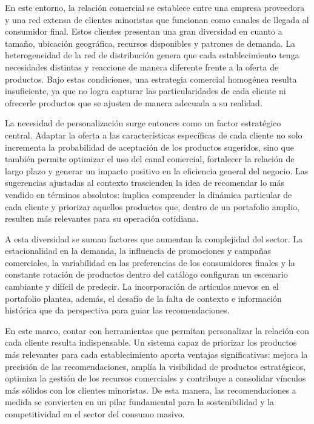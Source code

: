 En este entorno, la relación comercial se establece entre una empresa proveedora y una red extensa de clientes minoristas que funcionan como canales de llegada al consumidor final. Estos clientes presentan una gran diversidad en cuanto a tamaño, ubicación geográfica, recursos disponibles y patrones de demanda. La heterogeneidad de la red de distribución genera que cada establecimiento tenga necesidades distintas y reaccione de manera diferente frente a la oferta de productos. Bajo estas condiciones, una estrategia comercial homogénea resulta insuficiente, ya que no logra capturar las particularidades de cada cliente ni ofrecerle productos que se ajusten de manera adecuada a su realidad.

La necesidad de personalización surge entonces como un factor estratégico central. Adaptar la oferta a las características específicas de cada cliente no solo incrementa la probabilidad de aceptación de los productos sugeridos, sino que también permite optimizar el uso del canal comercial, fortalecer la relación de largo plazo y generar un impacto positivo en la eficiencia general del negocio. Las sugerencias ajustadas al contexto trascienden la idea de recomendar lo más vendido en términos absolutos: implica comprender la dinámica particular de cada cliente y priorizar aquellos productos que, dentro de un portafolio amplio, resulten más relevantes para su operación cotidiana.

A esta diversidad se suman factores que aumentan la complejidad del sector. La estacionalidad en la demanda, la influencia de promociones y campañas comerciales, la variabilidad en las preferencias de los consumidores finales y la constante rotación de productos dentro del catálogo configuran un escenario cambiante y difícil de predecir. La incorporación de artículos nuevos en el portafolio plantea, además, el desafío de la falta de contexto e información histórica que da perspectiva para guiar las recomendaciones.

En este marco, contar con herramientas que permitan personalizar la relación con cada cliente resulta indispensable. Un sistema capaz de priorizar los productos más relevantes para cada establecimiento aporta ventajas significativas: mejora la precisión de las recomendaciones, amplía la visibilidad de productos estratégicos, optimiza la gestión de los recursos comerciales y contribuye a consolidar vínculos más sólidos con los clientes minoristas. De esta manera, las recomendaciones a medida se convierten en un pilar fundamental para la sostenibilidad y la competitividad en el sector del consumo masivo.

